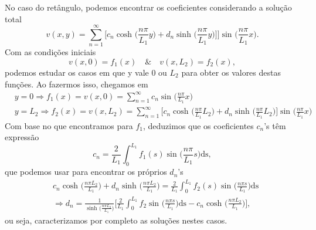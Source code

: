 \documentclass[../pde_notes.tex]{subfiles}
\begin{document}
No caso do retângulo, podemos encontrar os coeficientes considerando a solução total
\[
	v(x, y) = \sum\limits_{n=1}^{\infty}\biggl[c_{n}\cosh^{}{\biggl(\frac{n\pi }{L_1}y\biggr)} + d_{n}\sinh^{}{\biggl(\frac{n\pi }{L_1}y\biggr)}]\biggr]\sin^{}{\biggl(\frac{n\pi }{L_1}x\biggr)}.
\]
Com as condições iniciais
\[
	v(x,0)=f_1(x) \quad\&\quad v(x, L_2) = f_2(x),
\]
podemos estudar os casos em que y vale 0 ou \(L_2\) para obter os valores destas funções. Ao fazermos isso, chegamos em
\begin{align*}
	 & y = 0 \Rightarrow f_1(x) = v(x, 0) = \sum\limits_{n=1}^{\infty}c_{n}\sin^{}{\biggl(\frac{n\pi }{L_1}x\biggr)}                                                                                                                 \\
	 & y = L_2 \Rightarrow f_2(x) = v(x, L_2) = \sum\limits_{n=1}^{\infty}\biggl[c_{n}\cosh^{}{\biggl(\frac{n\pi }{L_1}L_2\biggr)}+d_{n}\sinh^{}{\biggl(\frac{n\pi }{L_1}L_2\biggr)}\biggr]\sin^{}{\biggl(\frac{n\pi }{L_1}x\biggr)}
\end{align*}
Com base no que encontramos para \(f_1\), deduzimos que os coeficientes \(c_{n}\)'s têm expressão
\[
	c_{n} = \frac{2}{L_1}\int_{0}^{L_1}f_1(s)\sin^{}{\biggl(\frac{n\pi }{L_1}s\biggr)} \mathrm{ds},
\]
que podemos usar para encontrar os próprios \(d_{n}\)'s
\begin{align*}
	 & c_{n}\cosh^{}{\biggl(\frac{n\pi L_2}{L_1}\biggr)} + d_{n}\sinh^{}{\biggl(\frac{n\pi L_2}{L_1}\biggr)} =  \frac{2}{L_1}\int_{0}^{L_1}f_2(s)\sin^{}{\biggl(\frac{n\pi s}{L_1}\biggr)} \mathrm{ds}                                    \\
	 & \Rightarrow d_{n} = \frac{1}{\sinh^{}{\biggl(\frac{n\pi L_2}{L_1}\biggr)}}\biggl[\frac{2}{L_1}\int_{0}^{L_1}f_{2}\sin^{}{\biggl(\frac{n\pi s}{L_1}\biggr)} \mathrm{ds} - c_{n}\cosh^{}{\biggl(\frac{n\pi L_2}{L_1}\biggr)}\biggr],
\end{align*}
ou seja, caracterizamos por completo as soluções nestes casos.
\end{document}
